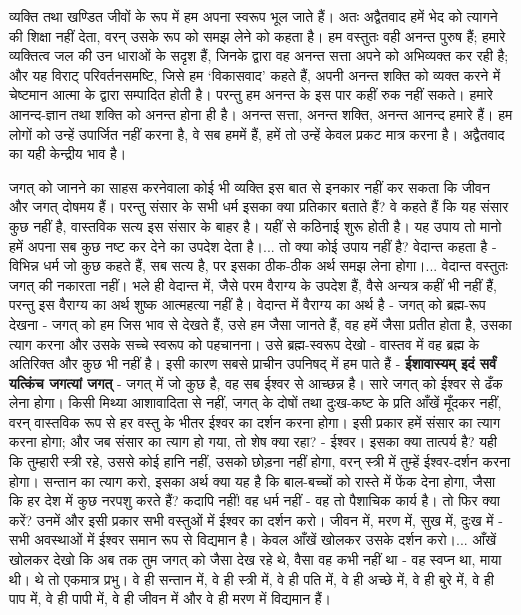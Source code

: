 व्यक्ति तथा खण्डित जीवों के रूप में हम अपना स्वरूप भूल जाते हैं। अतः अद्वैतवाद हमें भेद को त्यागने की शिक्षा नहीं देता, वरन् उसके रूप को समझ लेने को कहता है। हम वस्तुतः वही अनन्त पुरुष हैं; हमारे व्यक्तित्व जल की उन धाराओं के सदृश हैं, जिनके द्वारा वह अनन्त सत्ता अपने को अभिव्यक्त कर रही है; और यह विराट् परिवर्तनसमष्टि, जिसे हम ‘विकासवाद’ कहते हैं, अपनी अनन्त शक्ति को व्यक्त करने में चेष्टमान आत्मा के द्वारा सम्पादित होती है। परन्तु हम अनन्त के इस पार कहीं रुक नहीं सकते। हमारे आनन्द-ज्ञान तथा शक्ति को अनन्त होना ही है। अनन्त सत्ता, अनन्त शक्ति, अनन्त आनन्द हमारे हैं। हम लोगों को उन्हें उपार्जित नहीं करना है, वे सब हममें हैं, हमें तो उन्हें केवल प्रकट मात्र करना है। अद्वैतवाद का यही केन्द्रीय भाव है। 

जगत् को जानने का साहस करनेवाला कोई भी व्यक्ति इस बात से इनकार नहीं कर सकता कि जीवन और जगत् दोषमय हैं। परन्तु संसार के सभी धर्म इसका क्या प्रतिकार बताते हैं? वे कहते हैं कि यह संसार कुछ नहीं है, वास्तविक सत्य इस संसार के बाहर है। यहीं से कठिनाई शुरू होती है। यह उपाय तो मानो हमें अपना सब कुछ नष्ट कर देने का उपदेश देता है।... तो क्या कोई उपाय नहीं है? वेदान्त कहता है - विभिन्न धर्म जो कुछ कहते हैं, सब सत्य है, पर इसका ठीक-ठीक अर्थ समझ लेना होगा।... वेदान्त वस्तुतः जगत् की नकारता नहीं। भले ही वेदान्त में, जैसे परम वैराग्य के उपदेश हैं, वैसे अन्यत्र कहीं भी नहीं हैं, परन्तु इस वैराग्य का अर्थ शुष्क आत्महत्या नहीं है। वेदान्त में वैराग्य का अर्थ है - जगत् को ब्रह्म-रूप देखना - जगत् को हम जिस भाव से देखते हैं, उसे हम जैसा जानते हैं, वह हमें जैसा प्रतीत होता है, उसका त्याग करना और उसके सच्चे स्वरूप को पहचानना। उसे ब्रह्म-स्वरूप देखो - वास्तव में वह ब्रह्म के अतिरिक्त और कुछ भी नहीं है। इसी कारण सबसे प्राचीन उपनिषद् में हम पाते हैं - \textbf{ईशावास्यम् इदं सर्वं यत्किंच जगत्यां जगत् }- जगत् में जो कुछ है, वह सब ईश्वर से आच्छन्न है। सारे जगत् को ईश्वर से ढँक लेना होगा। किसी मिथ्या आशावादिता से नहीं, जगत् के दोषों तथा दुःख-कष्ट के प्रति आँखें मूँदकर नहीं, वरन् वास्तविक रूप से हर वस्तु के भीतर ईश्वर का दर्शन करना होगा। इसी प्रकार हमें संसार का त्याग करना होगा; और जब संसार का त्याग हो गया, तो शेष क्या रहा? - ईश्वर। इसका क्या तात्पर्य है? यही कि तुम्हारी स्त्री रहे, उससे कोई हानि नहीं, उसको छोड़ना नहीं होगा, वरन् स्त्री में तुम्हें ईश्वर-दर्शन करना होगा। सन्तान का त्याग करो, इसका अर्थ क्या यह है कि बाल-बच्चों को रास्ते में फेंक देना होगा, जैसा कि हर देश में कुछ नरपशु करते हैं? कदापि नहीं! वह धर्म नहीं - वह तो पैशाचिक कार्य है। तो फिर क्या करें? उनमें और इसी प्रकार सभी वस्तुओं में ईश्वर का दर्शन करो। जीवन में, मरण में, सुख में, दुःख में - सभी अवस्थाओं में ईश्वर समान रूप से विद्यमान है। केवल आँखें खोलकर उसके दर्शन करो।... आँखें खोलकर देखो कि अब तक तुम जगत् को जैसा देख रहे थे, वैसा वह कभी नहीं था - वह स्वप्न था, माया थी। थे तो एकमात्र प्रभु। वे ही सन्तान में, वे ही स्त्री में, वे ही पति में, वे ही अच्छे में, वे ही बुरे में, वे ही पाप में, वे ही पापी में, वे ही जीवन में और वे ही मरण में विद्यमान हैं। 

